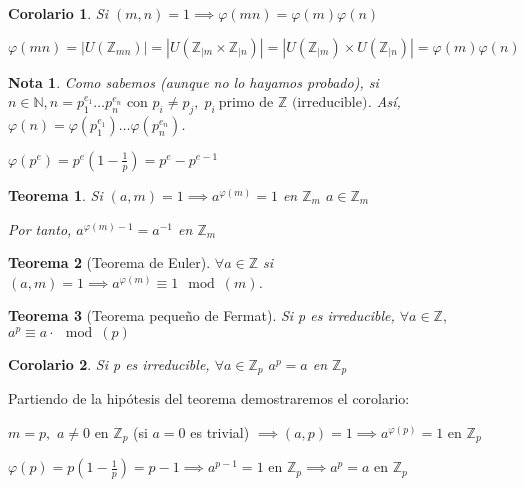 \documentclass[11pt, a4paper, titlepage]{article}
\makeatletter
\renewenvironment{proof}[1][\proofname] {\vspace{-15pt}\par\pushQED{\qed}\normalfont\topsep6\p@\@plus6\p@\relax\trivlist\item[\hskip\labelsep\it#1\@addpunct{.}]\ignorespaces}{\popQED\endtrivlist\@endpefalse}
\theoremstyle{theorem-style}
\newtheorem*{nth}{Teorema}
\newtheorem{ncor}{Corolario}
\theoremstyle{definition-style}
\theoremstyle{remark-style}
\newtheorem*{nota}{Nota}
\theoremstyle{example-style}
\makeatother
\begin{document}
\begin{ncor}
  Si $(m,n) = 1 \implies \varphi(mn) = \varphi(m)\varphi(n)$
\end{ncor}

\begin{proof}
  $\varphi(mn) = |U(\mathbb{Z}_{mn})| = |U(\mathbb{Z}_{|m}\times\mathbb{Z}_{|n})| = |U(\mathbb{Z}_{|m}) \times U(\mathbb{Z}_{|n})| = \varphi(m)\varphi(n)$
\end{proof}
\begin{nota}
  Como sabemos (aunque no lo hayamos probado), si $n\in \mathbb{N}, n= p_1^{e_1}\dots p_n^{e_n} \text{ con } p_i \ne p_j,\; p_i\ \text{primo de $\mathbb{Z}$ (irreducible)}$. Así, $\varphi(n) = \varphi(p_1^{e_1})\dots\varphi(p_n^{e_n})$.
  
  $\varphi(p^e) = p^e(1-\frac{1}{p}) = p^e-p^{e-1}$
\end{nota}



\begin{nth}
	Si $(a,m)=1 \implies a^{\varphi(m)} = 1$ en $ \mathbb Z_{m}$ \hspace{0.5cm} $a \in \mathbb Z_{m} $

Por tanto, $ a^{\varphi(m)-1} = a^{-1} $ en $ \mathbb Z_{m} $

\end{nth}


\begin{nth}[Teorema de Euler]
	$ \forall a \in \mathbb Z $ si $(a,m) = 1 \implies a^{\varphi(m)} \equiv 1 \mod(m)$.
\end{nth}


\begin{nth}[Teorema pequeño de Fermat]
	Si p es irreducible, $ \forall a \in \mathbb Z, $ $ a^{p} \equiv a \cdot \mod(p) $ 
\end{nth}



\begin{ncor}
	Si p es irreducible, $ \forall a \in \mathbb Z_{p} $	 \hspace{0.25cm} $ a^{p} = a $ en $ \mathbb Z_{p} $
\end{ncor}


\begin{proof}
	Partiendo de la hipótesis del teorema demostraremos el corolario:

$ m = p, $ $ a \neq 0 $ en  $ \mathbb Z_{p}$ (si $a=0$ es trivial) $ \implies (a,p) = 1 \implies a^{\varphi(p)} = 1 $ en $ \mathbb Z_{p} $

$ \varphi(p) = p(1-\frac{1}{p}) = p-1 \implies a^{p-1} = 1 $ en $ \mathbb Z_{p} \implies a^p=a $ en $ \mathbb Z_{p} $
	
\end{proof}
\end{document}
